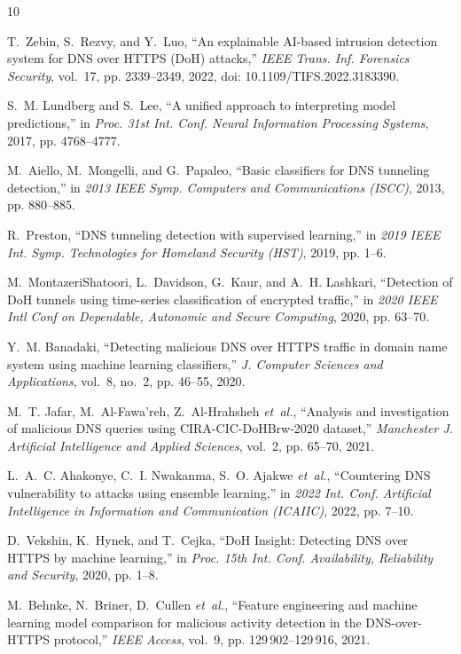 \documentclass[conference]{IEEEtran}
\begin{document}
\begin{thebibliography}{10}

T.~Zebin, S.~Rezvy, and Y.~Luo, ``An explainable AI-based intrusion detection system for DNS over HTTPS (DoH) attacks,'' \emph{IEEE Trans. Inf. Forensics Security}, vol.~17, pp. 2339--2349, 2022, doi: 10.1109/TIFS.2022.3183390.

S.~M. Lundberg and S.~Lee, ``A unified approach to interpreting model predictions,'' in \emph{Proc. 31st Int. Conf. Neural Information Processing Systems}, 2017, pp. 4768--4777.

M.~Aiello, M.~Mongelli, and G.~Papaleo, ``Basic classifiers for DNS tunneling detection,'' in \emph{2013 IEEE Symp. Computers and Communications (ISCC)}, 2013, pp. 880--885.

R.~Preston, ``DNS tunneling detection with supervised learning,'' in \emph{2019 IEEE Int. Symp. Technologies for Homeland Security (HST)}, 2019, pp. 1--6.

M.~MontazeriShatoori, L.~Davidson, G.~Kaur, and A.~H. Lashkari, ``Detection of DoH tunnels using time-series classification of encrypted traffic,'' in \emph{2020 IEEE Intl Conf on Dependable, Autonomic and Secure Computing}, 2020, pp. 63--70.

Y.~M. Banadaki, ``Detecting malicious DNS over HTTPS traffic in domain name system using machine learning classifiers,'' \emph{J. Computer Sciences and Applications}, vol.~8, no.~2, pp. 46--55, 2020.

M.~T. Jafar, M.~Al-Fawa'reh, Z.~Al-Hrahsheh \emph{et~al.}, ``Analysis and investigation of malicious DNS queries using CIRA-CIC-DoHBrw-2020 dataset,'' \emph{Manchester J. Artificial Intelligence and Applied Sciences}, vol.~2, pp. 65--70, 2021.

L.~A.~C. Ahakonye, C.~I. Nwakanma, S.~O. Ajakwe \emph{et~al.}, ``Countering DNS vulnerability to attacks using ensemble learning,'' in \emph{2022 Int. Conf. Artificial Intelligence in Information and Communication (ICAIIC)}, 2022, pp. 7--10.

D.~Vekshin, K.~Hynek, and T.~Cejka, ``DoH Insight: Detecting DNS over HTTPS by machine learning,'' in \emph{Proc. 15th Int. Conf. Availability, Reliability and Security}, 2020, pp. 1--8.

M.~Behnke, N.~Briner, D.~Cullen \emph{et~al.}, ``Feature engineering and machine learning model comparison for malicious activity detection in the DNS-over-HTTPS protocol,'' \emph{IEEE Access}, vol.~9, pp. 129\,902--129\,916, 2021.


\end{thebibliography}
\end{document}
